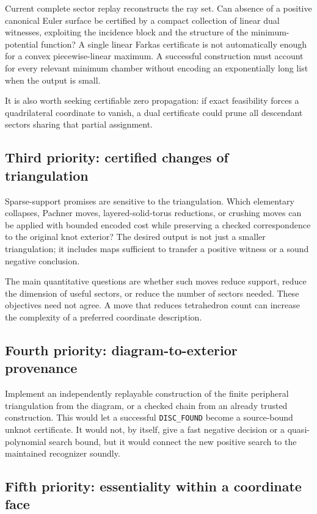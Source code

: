 \documentclass[11pt]{article}
\theoremstyle{definition}
\theoremstyle{remark}
\newcommand{\code}[1]{\texttt{#1}}
\begin{document}
Current complete sector replay reconstructs the ray set. Can absence of a
positive canonical Euler surface be certified by a compact collection of
linear dual witnesses, exploiting the incidence block and the structure of
the minimum-potential function? A single linear Farkas certificate is not
automatically enough for a convex piecewise-linear maximum. A successful
construction must account for every relevant minimum chamber without
encoding an exponentially long list when the output is small.

It is also worth seeking certifiable zero propagation: if exact feasibility
forces a quadrilateral coordinate to vanish, a dual certificate could prune
all descendant sectors sharing that partial assignment.

\subsection{Third priority: certified changes of triangulation}

Sparse-support promises are sensitive to the triangulation. Which elementary
collapses, Pachner moves, layered-solid-torus reductions, or crushing moves
can be applied with bounded encoded cost while preserving a checked
correspondence to the original knot exterior? The desired output is not
just a smaller triangulation; it includes maps sufficient to transfer a
positive witness or a sound negative conclusion.

The main quantitative questions are whether such moves reduce support,
reduce the dimension of useful sectors, or reduce the number of sectors
needed. These objectives need not agree. A move that reduces tetrahedron
count can increase the complexity of a preferred coordinate description.

\subsection{Fourth priority: diagram-to-exterior provenance}

Implement an independently replayable construction of the finite peripheral
triangulation from the diagram, or a checked chain from an already trusted
construction. This would let a successful \code{DISC\_FOUND} become a
source-bound unknot certificate. It would not, by itself, give a fast
negative decision or a quasi-polynomial search bound, but it would connect
the new positive search to the maintained recognizer soundly.

\subsection{Fifth priority: essentiality within a coordinate face}
\end{document}
